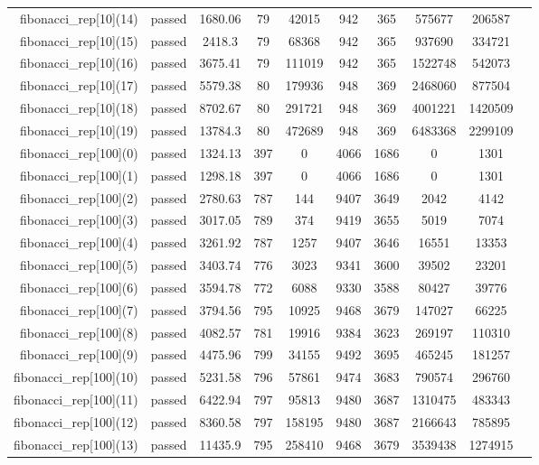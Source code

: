 \begin{longtable}{r|ccccccccc}
    fibonacci\_rep[10](14) & passed & 1680.06 & 79 & 42015 & 942 & 365 & 575677 & 206587 \\
    fibonacci\_rep[10](15) & passed & 2418.3 & 79 & 68368 & 942 & 365 & 937690 & 334721 \\
    fibonacci\_rep[10](16) & passed & 3675.41 & 79 & 111019 & 942 & 365 & 1522748 & 542073 \\
    fibonacci\_rep[10](17) & passed & 5579.38 & 80 & 179936 & 948 & 369 & 2468060 & 877504 \\
    fibonacci\_rep[10](18) & passed & 8702.67 & 80 & 291721 & 948 & 369 & 4001221 & 1420509 \\
    fibonacci\_rep[10](19) & passed & 13784.3 & 80 & 472689 & 948 & 369 & 6483368 & 2299109 \\
    fibonacci\_rep[100](0) & passed & 1324.13 & 397 & 0 & 4066 & 1686 & 0 & 1301 \\
    fibonacci\_rep[100](1) & passed & 1298.18 & 397 & 0 & 4066 & 1686 & 0 & 1301 \\
    fibonacci\_rep[100](2) & passed & 2780.63 & 787 & 144 & 9407 & 3649 & 2042 & 4142 \\
    fibonacci\_rep[100](3) & passed & 3017.05 & 789 & 374 & 9419 & 3655 & 5019 & 7074 \\
    fibonacci\_rep[100](4) & passed & 3261.92 & 787 & 1257 & 9407 & 3646 & 16551 & 13353 \\
    fibonacci\_rep[100](5) & passed & 3403.74 & 776 & 3023 & 9341 & 3600 & 39502 & 23201 \\
    fibonacci\_rep[100](6) & passed & 3594.78 & 772 & 6088 & 9330 & 3588 & 80427 & 39776 \\
    fibonacci\_rep[100](7) & passed & 3794.56 & 795 & 10925 & 9468 & 3679 & 147027 & 66225 \\
    fibonacci\_rep[100](8) & passed & 4082.57 & 781 & 19916 & 9384 & 3623 & 269197 & 110310 \\
    fibonacci\_rep[100](9) & passed & 4475.96 & 799 & 34155 & 9492 & 3695 & 465245 & 181257 \\
    fibonacci\_rep[100](10) & passed & 5231.58 & 796 & 57861 & 9474 & 3683 & 790574 & 296760 \\
    fibonacci\_rep[100](11) & passed & 6422.94 & 797 & 95813 & 9480 & 3687 & 1310475 & 483343 \\
    fibonacci\_rep[100](12) & passed & 8360.58 & 797 & 158195 & 9480 & 3687 & 2166643 & 785895 \\
    fibonacci\_rep[100](13) & passed & 11435.9 & 795 & 258410 & 9468 & 3679 & 3539438 & 1274915 \\

\end{longtable}
